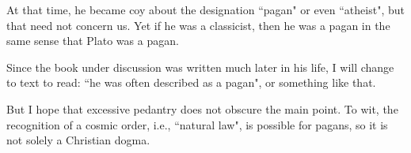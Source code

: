 \begin{footnotesize}
\begin{sffamily}
At that time, he became coy about the designation ``pagan" or even ``atheist", but that need not concern us. Yet if he was a classicist, then he was a pagan in the same sense that Plato was a pagan.

Since the book under discussion was written much later in his life, I will change to text to read: ``he was often described as a pagan", or something like that.

But I hope that excessive pedantry does not obscure the main point. To wit, the recognition of a cosmic order, i.e., ``natural law", is possible for pagans, so it is not solely a Christian dogma.


\end{sffamily}\end{footnotesize}
